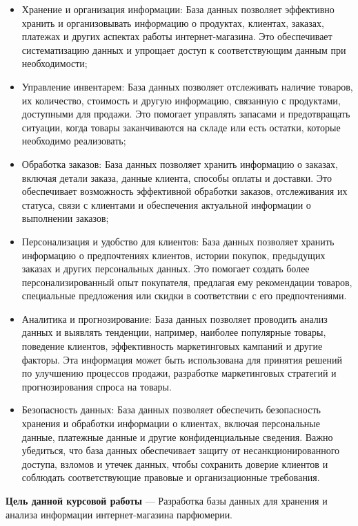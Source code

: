 \begin{itemize}
	\item Хранение и организация информации: База данных позволяет эффективно хранить и организовывать информацию о продуктах, клиентах, заказах, платежах и других аспектах работы интернет-магазина. Это обеспечивает систематизацию данных и упрощает доступ к соответствующим данным при необходимости;
	\item Управление инвентарем: База данных позволяет отслеживать наличие товаров, их количество, стоимость и другую информацию, связанную с продуктами, доступными для продажи. Это помогает управлять запасами и предотвращать ситуации, когда товары заканчиваются на складе или есть остатки, которые необходимо реализовать;
	\item Обработка заказов: База данных позволяет хранить информацию о заказах, включая детали заказа, данные клиента, способы оплаты и доставки. Это обеспечивает возможность эффективной обработки заказов, отслеживания их статуса, связи с клиентами и обеспечения актуальной информации о выполнении заказов;
	\item Персонализация и удобство для клиентов: База данных позволяет хранить информацию о предпочтениях клиентов, истории покупок, предыдущих заказах и других персональных данных. Это помогает создать более персонализированный опыт покупателя, предлагая ему рекомендации товаров, специальные предложения или скидки в соответствии с его предпочтениями.
	\item Аналитика и прогнозирование: База данных позволяет проводить анализ данных и выявлять тенденции, например, наиболее популярные товары, поведение клиентов, эффективность маркетинговых кампаний и другие факторы. Эта информация может быть использована для принятия решений по улучшению процессов продажи, разработке маркетинговых стратегий и прогнозирования спроса на товары.
	\item Безопасность данных: База данных позволяет обеспечить безопасность хранения и обработки информации о клиентах, включая персональные данные, платежные данные и другие конфиденциальные сведения. Важно убедиться, что база данных обеспечивает защиту от несанкционированного доступа, взломов и утечек данных, чтобы сохранить доверие клиентов и соблюдать соответствующие правовые и организационные требования.
\end{itemize}

\textbf{Цель данной курсовой работы} --- Разработка базы данных для хранения и анализа информации интернет-магазина парфюмерии.

